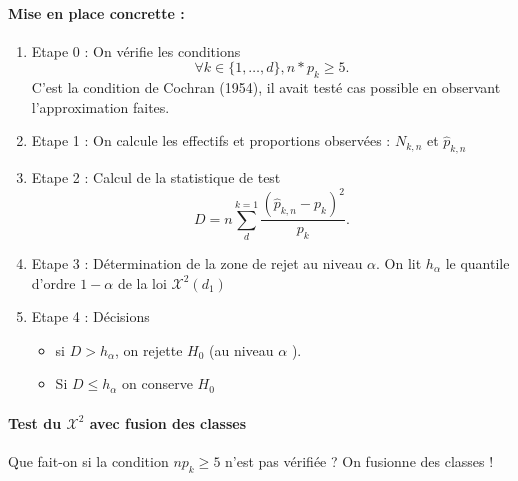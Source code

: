 \documentclass{article}
\theoremstyle{plain}%
\theoremstyle{definition}
\theoremstyle{remark}
\begin{document}
\paragraph{Mise en place concrette :} 
\begin{enumerate}
    \item Etape 0 : On vérifie les conditions 
    \[
        \forall k \in \{1, \dots, d\}, n*p_k \geq 5
    .\]
    C'est la condition de Cochran (1954), il avait testé cas possible en observant l'approximation faites.
    \item Etape 1 : On calcule les effectifs et proportions observées : $ N_{k,n} $ et $ \hat{p}_{k,n} $  
    \item Etape 2 : Calcul de la statistique de test 
    \[
        D = n \sum_{d}^{k=1} \frac{(\hat{p}_{k,n} - p_k)^2}{p_k}
    .\]
    \item Etape 3 : Détermination de la zone de rejet au niveau $ \alpha  $. On lit $ h_\alpha  $ le quantile d'ordre $ 1-\alpha  $ de la loi $ \mathcal{X}^2(d_1) $ 
    \item Etape 4 : Décisions \begin{itemize}
        \item si $ D > h_\alpha  $, on rejette $ H_0 $ (au niveau $ \alpha  $ ). 
        \item Si $ D \leq h_\alpha  $ on conserve $ H_0 $ 
    \end{itemize}
\end{enumerate}

\paragraph{Test du $ \mathcal{X}^2 $ avec fusion des classes} 
Que fait-on si la condition $ np_k \geq 5 $ n'est pas vérifiée ? On fusionne des classes ! 
\end{document}
